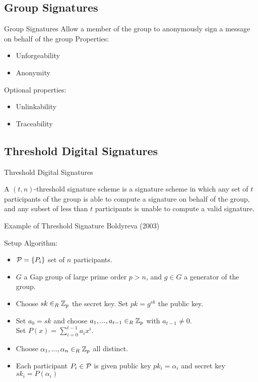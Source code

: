 \subsection{Group Signatures}
\begin{frame}{Group Signatures}
Allow a member of the group to anonymously sign a message on behalf of the group
Properties:
\begin{itemize}
\item Unforgeability
\item Anonymity
\end{itemize}

Optional properties:
\begin{itemize}
\item Unlinkability
\item Traceability
\end{itemize}

\end{frame}

\subsection{Threshold Digital Signatures}
\begin{frame}{Threshold Digital Signatures}
\begin{defn}
A $(t,n)$-threshold signature scheme is a signature scheme in which any set of $t$ participants of the group is able to compute a signature on behalf of the group, and any subset of less than $t$ participants is unable to compute a valid signature.
\end{defn}

\end{frame}

\begin{frame}{Example of Threshold Signature}
Boldyreva (2003)

Setup Algorithm:
\begin{itemize}
\item ${\mathcal P}=\{P_i\}$ set of $n$ participants.
\item $G$ a Gap group of large prime order $p > n$, and $g \in G$ a generator of the group.
\item Choose $sk \in_R {\mathbb Z}_p$ the secret key. Set $pk = g^{sk}$ the public key.
\item Set $a_0 = sk$ and choose $a_1, ..., a_{t-1} \in_R {\mathbb Z}_p$ with $a_{t-1} \neq 0$. \\
        Set $P(x) = \sum_{i=0}^{t-1} a_i x^i$.
\item Choose $\alpha_1, ..., \alpha_n \in_R {\mathbb Z}_p$ all distinct.
\item Each participant $P_i \in {\mathcal P}$ is given public key $pk_i = \alpha_i$ and secret key $sk_i = P(\alpha_i)$
\end{itemize}

\end{frame}

